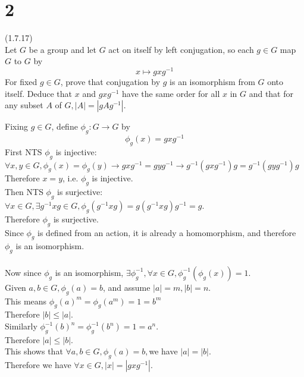 \documentclass{article}
\begin{document}
\section*{2}
(1.7.17)\\
Let $G$ be a group and let $G$ act on itself by left conjugation, so each $g \in G$ map $G$ to $G$ by
\begin{equation*}
    x \mapsto gxg^{-1}
\end{equation*}
For fixed $g \in G$, prove that conjugation by $g$ is an isomorphism from $G$ onto itself. Deduce that $x$ and $gxg^{-1}$ have the same order for all $x$ in $G$ and that for any subset $A$ of $G, |A| = |gAg^{-1}|$.
\begin{addmargin}[1em]{0em}
    Fixing $g \in G$, define $\phi_g: G \rightarrow G$ by
    \begin{equation*}
        \phi_g(x) = gxg^{-1}
    \end{equation*}
    First NTS $\phi_g$ is injective:\\
    $\forall x, y \in G, \phi_g(x) = \phi_g(y) \rightarrow gxg^{-1} = gyg^{-1} \rightarrow g^{-1}(gxg^{-1})g = g^{-1}(gyg^{-1})g$\\
    Therefore $x = y$, i.e. $\phi_g$ is injective.\\
    Then NTS $\phi_g$ is surjective:\\
    $\forall x \in G, \exists g^{-1}xg \in G, \phi_g(g^{-1}xg) = g(g^{-1}xg)g^{-1} = g$.\\
    Therefore $\phi_g$ is surjective.\\
    Since $\phi_g$ is defined from an action, it is already a homomorphism, and therefore $\phi_g$ is an isomorphism.\\\\
    Now since $\phi_g$ is an isomorphism, $\exists \phi_g^{-1}, \forall x \in G, \phi_g^{-1}(\phi_g(x)) = 1$.\\
    Given $a, b \in G, \phi_g(a) = b$, and assume $|a| = m, |b| = n$.\\
    This means $\phi_g(a)^m = \phi_g(a^m) = 1 = b^m$\\
    Therefore $|b| \leq |a|$.\\
    Similarly $\phi_g^{-1}(b)^n = \phi_g^{-1}(b^n) = 1 = a^n$.\\
    Therefore $|a| \leq |b|$.\\
    This shows that $\forall a, b \in G, \phi_g(a) = b,$we have $|a| = |b|$.\\
    Therefore we have $\forall x \in G, |x| = |gxg^{-1}|$.\\\\

\end{addmargin}
\end{document}
